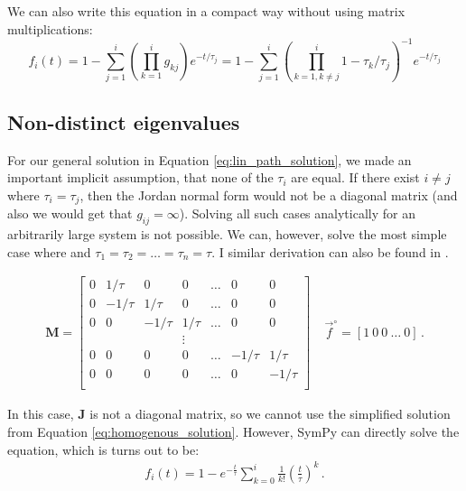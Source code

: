 \documentclass{article}
\newcommand{\finit}{\ensuremath{\vec{f}^\circ}}
\begin{document}
We can also write this equation in a compact way without using matrix multiplications:
\begin{equation}
f_i(t) = 
1 - \sum_{j=1}^{i} \left(\prod_{k=1}^{i} g_{kj}\right) e^{- t/\tau_j} = 
1 - \sum_{j=1}^{i} \left(\prod_{k = 1, k \neq j}^{i} 1 - \tau_k/\tau_j\right)^{-1} e^{- t/\tau_j}
\end{equation}

\subsection{Non-distinct eigenvalues}\label{sec:equal_taus}
For our general solution in Equation \ref{eq:lin_path_solution}, we made an important implicit assumption, that none of the $\tau_i$ are equal. If there exist $i \neq j$ where $\tau_i = \tau_j$, then the Jordan normal form would not be a diagonal matrix (and also we would get that $g_{ij} = \infty$). Solving all such cases analytically for an arbitrarily large system is not possible. We can, however, solve the most simple case where and $\tau_1 = \tau_2 = \ldots = \tau_n = \tau$. I similar derivation can also be found in \cite{sokol_theoretical_2015}.

\begin{eqnarray}
\mathbf{M} =
\begin{bmatrix}
0 & 1/\tau & 0 & 0 & \ldots & 0 & 0\\
0 & -1/\tau & 1/\tau & 0 & \ldots & 0 & 0\\
0 & 0 & -1/\tau & 1/\tau & \ldots & 0 & 0\\
& & & \vdots & & &\\
0 & 0 & 0 & 0 & \ldots & -1/\tau & 1/\tau\\
0 & 0 & 0 & 0 & \ldots & 0 & -1/\tau \\
\end{bmatrix}
~~~~~
\finit = \left[1~0~0~\ldots~0\right]\,.
\end{eqnarray}

In this case, $\mathbf{J}$ is not a diagonal matrix, so we cannot use the simplified solution from Equation \ref{eq:homogenous_solution}. However, SymPy can directly solve the equation, which is turns out to be:
\begin{eqnarray}\label{eq:equal_tau_solution}
    f_i(t) = 1 - e^{-\frac{t}{\tau}}\sum_{k=0}^i \frac{1}{k!}\left(\frac{t}{\tau}\right)^k\,.
\end{eqnarray}
\end{document}
